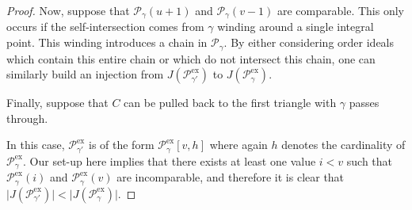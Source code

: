 \documentclass[10pt,a4paper]{amsart}
\newcommand{\calP}{\mathcal{P}}
\newcommand{\exx}{\mathrm{ex}}
\begin{document}
\begin{proof}
 Now, suppose that $\calP_\gamma(u+1)$ and $\calP_\gamma(v-1)$ are comparable. This only occurs if the self-intersection comes from $\gamma$ winding around a single integral point. This winding introduces a chain in $\calP_\gamma$. By either considering order ideals which contain this entire chain or which do not intersect this chain, one can similarly build an injection from $J(\calP_{\gamma'}^\exx)$ to $J(\calP_\gamma^\exx)$.

Finally, suppose that $C$ can be pulled back to the first triangle with $\gamma$ passes through. 

\begin{center}
\end{center}

In this case, $\calP_{\gamma'}^\exx$ is of the form $\calP_{\gamma}^\exx[v,h]$ where again $h$ denotes the cardinality of $\calP_{\gamma}^\exx$. Our set-up here implies that there exists at least one value $i < v$ such that $\calP_{\gamma}^\exx(i)$ and $\calP_{\gamma}^\exx(v)$ are incomparable, and therefore it is clear that $\vert J(\calP_{\gamma'}^\exx) \vert < \vert J(\calP_{\gamma}^\exx) \vert$.
\end{proof}
\end{document}
